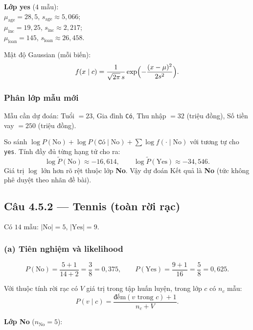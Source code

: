 \medskip
\noindent\textbf{Lớp yes} (\(4\) mẫu): \\
\(\mu_{\text{age}}=28{,}5\), \(s_{\text{age}}\approx 5{,}066\); \\
\(\mu_{\text{inc}}=19{,}25\), \(s_{\text{inc}}\approx 2{,}217\); \\
\(\mu_{\text{loan}}=145\), \(s_{\text{loan}}\approx 26{,}458\).

\noindent Mật độ Gaussian (mỗi biến):
\[
f(x\mid c)=\frac{1}{\sqrt{2\pi}\,s}\exp\Bigl(-\frac{(x-\mu)^2}{2s^2}\Bigr).
\]

\subsubsection*{Phân lớp mẫu mới}

Mẫu cần dự đoán: Tuổi \(=23\), Gia đình \texttt{Có}, Thu nhập \(=32\) (triệu đồng), Số tiền vay \(=250\) (triệu đồng).

So sánh \(\log P(\text{No})+\log P(\texttt{Có}\mid\text{No})+\sum \log f(\cdot\mid\text{No})\) với tương tự cho \texttt{yes}. Tính đầy đủ từng hạng tử cho ra:
\[
\log \tilde P(\text{No})\approx -16{,}614,\qquad
\log \tilde P(\text{Yes})\approx -34{,}546.
\]
Giá trị \(\log\) lớn hơn rõ rệt thuộc lớp \textbf{No}. Vậy dự đoán Kết quả là \textbf{No} (tức không phê duyệt theo nhãn đề bài).

\subsection*{Câu 4.5.2 --- Tennis (toàn rời rạc)}

Có \(14\) mẫu: \(|\text{No}|=5\), \(|\text{Yes}|=9\).

\subsubsection*{(a) Tiên nghiệm và likelihood}

\[
P(\text{No})=\frac{5+1}{14+2}=\frac{3}{8}=0{,}375,\qquad
P(\text{Yes})=\frac{9+1}{16}=\frac{5}{8}=0{,}625.
\]

Với thuộc tính rời rạc có \(V\) giá trị trong tập huấn luyện, trong lớp \(c\) có \(n_c\) mẫu:
\[
P(v\mid c)=\frac{\text{đếm}(v\text{ trong }c)+1}{n_c+V}.
\]

\medskip
\noindent\textbf{Lớp No} (\(n_{\text{No}}=5\)):

